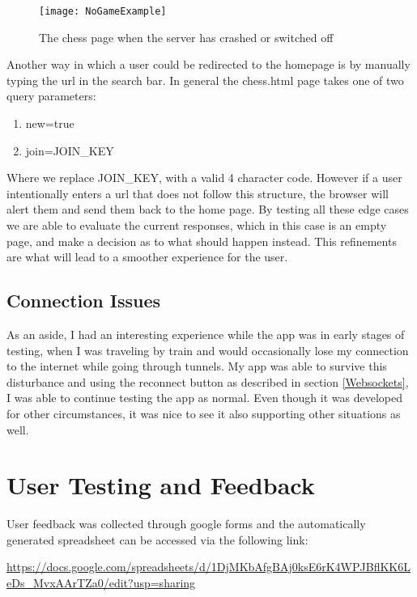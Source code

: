 \begin{figure}[h]
    \begin{center}
        \texttt{[image: NoGameExample]}
        \caption{The chess page when the server has crashed or switched off}
    \end{center}
\end{figure}

Another way in which a user could be redirected to the homepage is by manually typing the url in the search bar. In general the chess.html page takes one of two query parameters:

\begin{enumerate}
    \item new=true
    \item join={JOIN\_KEY}
\end{enumerate}

Where we replace JOIN\_KEY, with a valid 4 character code. However if a user intentionally enters a url that does not follow this structure, the browser will alert them and send them back to the home page. By testing all these edge cases we are able to evaluate the current responses, which in this case is an empty page, and make a decision as to what should happen instead. This refinements are what will lead to a smoother experience for the user.

\subsection{Connection Issues}

As an aside, I had an interesting experience while the app was in early stages of testing, when I was traveling by train and would occasionally lose my connection to the internet while going through tunnels. My app was able to survive this disturbance and using the reconnect button as described in section \ref{Websockets}, I was able to continue testing the app as normal. Even though it was developed for other circumstances, it was nice to see it also supporting other situations as well.

\section{User Testing and Feedback}
\label{UserTestingAndFeedback}

User feedback was collected through google forms and the automatically generated spreadsheet can be accessed via the following link:
\begin{center}
    \url{https://docs.google.com/spreadsheets/d/1DjMKbAfgBAj0ksE6rK4WPJBflKK6LeDs_MvxAArTZa0/edit?usp=sharing}
\end{center}

